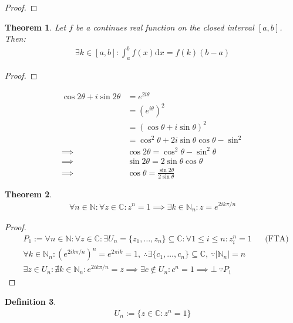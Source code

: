 \documentclass{article}
\theoremstyle{plain}
\newtheorem{theorem}{Theorem}
\theoremstyle{definition}
\newtheorem{definition}[theorem]{Definition}
\newcommand{\N}{\mathbb{N}}
\newcommand{\C}{\mathbb{C}}
\newcommand{\dx}{\text{d}}
\begin{document}
\begin{proof}
\end{proof}
\begin{theorem}
	Let $f$ be a continues real function on the closed interval $[a,b]$. Then:
	\begin{equation}
	\begin{aligned}
		\exists k \in [a,b]: \int_a^b f(x) \dx x = f(k)(b-a)
	\end{aligned}
	\end{equation}
\end{theorem}
\begin{proof}
\end{proof}
\newpage
\begin{align*}
	\cos 2\theta + i \sin 2\theta &= e^{2i\theta } \\
								  &= {\left(e^{i\theta }\right)}^2 \\
								  &= {\left(\cos \theta+i\sin \theta\right)}^2\\
								  &= \cos^2 \theta 
									 + 2i \sin \theta \cos \theta - \sin^2 \\
	\implies &\cos 2\theta = \cos^2 \theta - \sin^2 \theta \\
	\implies &\sin 2\theta = 2 \sin \theta \cos \theta \\
	\implies &\cos \theta = \frac{\sin 2\theta}{2\sin \theta}
\end{align*}
\begin{theorem}
\begin{align*}
	\forall n \in \N: \forall z\in \C:  
	z^n = 1 \implies \exists k \in \N_n : z = e^{2i k\pi / n}
\end{align*}
\end{theorem}
\begin{proof}
\begin{align*}
	&P_1:=
	\forall n \in \N: \forall z\in \C: \exists U_n= \{z_1,\dots,z_n\} 
	\subseteq \C:
	\forall 1 \leq i \leq n: z_i^n = 1 
	&& \text{(FTA)} \\
	&\forall k \in \N_n: {\left(e^{2ik \pi /n}\right)}^n = e^{2\pi i k} = 1,\
	\therefore \exists \{c_1,\dots,c_n\} \subseteq
	\C,\ \because\left|\N_n\right|=n \\
	&\exists z\in U_n : \nexists k \in \N_n: e^{2ik \pi /n} = z \implies
	\exists c \notin U_n: c^n = 1 \implies \bot\ \because P_1
\end{align*}
\end{proof}
\begin{definition}
\begin{align*}
	U_n := \{z\in \C: z^n = 1\} \\
\end{align*}
\end{definition}
\end{document}
